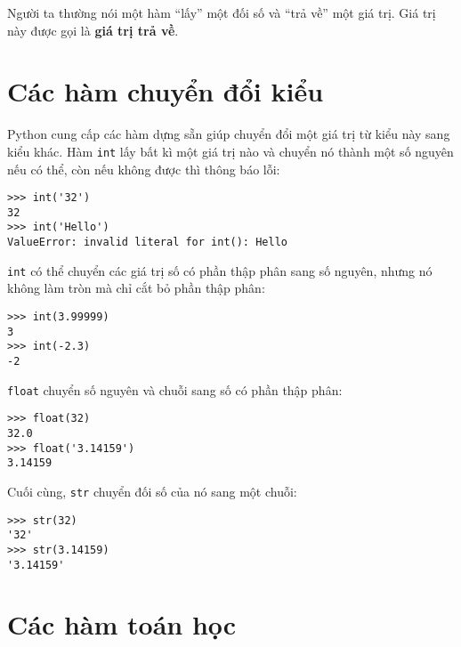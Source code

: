 \documentclass[11pt]{book}
\begin{document}
Người ta thường nói một hàm ``lấy'' một đối số và ``trả về''
một giá trị. Giá trị này được gọi là {\bf giá trị trả về}.



\section{Các hàm chuyển đổi kiểu}



Python cung cấp các hàm dựng sẵn giúp chuyển đổi một giá trị từ 
kiểu này sang kiểu khác. Hàm {\tt int} lấy bất kì một giá trị nào
và chuyển nó thành một số nguyên nếu có thể, còn nếu không được
thì thông báo lỗi:


\beforeverb
\begin{verbatim}
>>> int('32')
32
>>> int('Hello')
ValueError: invalid literal for int(): Hello
\end{verbatim}
\afterverb
%
{\tt int} có thể chuyển các giá trị số có phần thập phân
sang số nguyên, nhưng nó không làm tròn mà chỉ cắt bỏ
phần thập phân:

\beforeverb
\begin{verbatim}
>>> int(3.99999)
3
>>> int(-2.3)
-2
\end{verbatim}
\afterverb
%
{\tt float} chuyển số nguyên và chuỗi sang số có phần
thập phân:


\beforeverb
\begin{verbatim}
>>> float(32)
32.0
>>> float('3.14159')
3.14159
\end{verbatim}
\afterverb
%
Cuối cùng, {\tt str} chuyển đối số của nó sang một chuỗi:


\beforeverb
\begin{verbatim}
>>> str(32)
'32'
>>> str(3.14159)
'3.14159'
\end{verbatim}
\afterverb
%



\section{Các hàm toán học}
\end{document}
